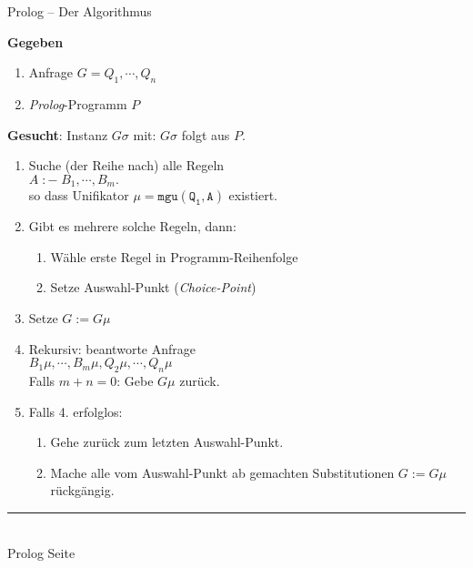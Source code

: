 \documentclass{slides}
\newcommand{\myrule}{\rule{20cm}{1mm}\\ }
\newcounter{mypage}
\begin{document}
\begin{slide}{}
\normalsize
\begin{center}
Prolog -- Der Algorithmus
\end{center}

\footnotesize
\textbf{Gegeben}
\begin{enumerate}
\item Anfrage \hspace*{3.5cm} $G = Q_1, \cdots, Q_n$
\item \textsl{Prolog}-Programm \quad $P$
\end{enumerate}

\textbf{Gesucht}: Instanz $G\sigma$ mit: \quad $G\sigma$ folgt aus $P$.
\begin{enumerate}
\item Suche (der Reihe nach) alle Regeln  \\[0.3cm]      
      \hspace*{1.3cm} $A \;\mathtt{:-}\; B_1,\cdots,B_m.$ \\[0.3cm]
      so dass Unifikator $\mu = \mathtt{mgu(Q_1,A)}$ existiert.
\item Gibt es mehrere solche Regeln, dann:
      \begin{enumerate}
      \item Wähle erste Regel in Programm-Reihenfolge
      \item Setze Auswahl-Punkt (\emph{Choice-Point})
      \end{enumerate}
\item Setze $G := G\mu$ 
\item Rekursiv: beantworte Anfrage \\[0.3cm]
      \hspace*{1.3cm} $B_1\mu, \cdots, B_m\mu, Q_2\mu, \cdots, Q_n\mu$ \\[0.3cm]
      Falls $m + n = 0$: Gebe $G\mu$ zurück.
\item Falls 4. erfolglos:
      \begin{enumerate}
      \item Gehe zurück zum letzten Auswahl-Punkt.
      \item Mache alle vom Auswahl-Punkt ab gemachten Substitutionen $G := G\mu$ rückgängig.
      \end{enumerate}
\end{enumerate}



\vspace*{\fill}
\tiny \addtocounter{mypage}{1}
\myrule
Prolog  \hspace*{\fill} Seite 
\end{slide}
\end{document}
